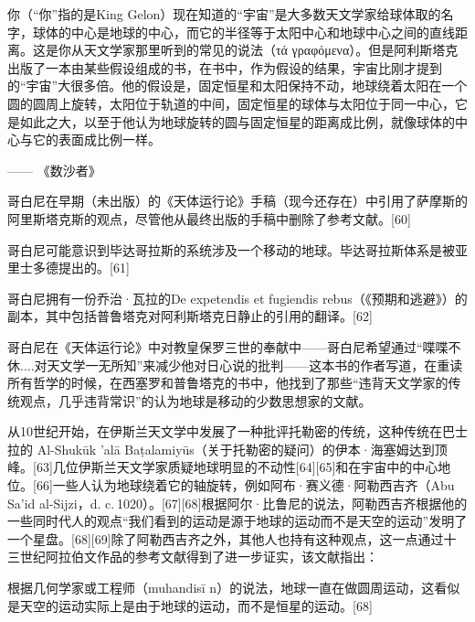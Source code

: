 你（“你”指的是King Gelon）现在知道的“宇宙”是大多数天文学家给球体取的名字，球体的中心是地球的中心，而它的半径等于太阳中心和地球中心之间的直线距离。这是你从天文学家那里听到的常见的说法（τά γραφόμενα）。但是阿利斯塔克出版了一本由某些假设组成的书，在书中，作为假设的结果，宇宙比刚才提到的“宇宙”大很多倍。他的假设是，固定恒星和太阳保持不动，地球绕着太阳在一个圆的圆周上旋转，太阳位于轨道的中间，固定恒星的球体与太阳位于同一中心，它是如此之大，以至于他认为地球旋转的圆与固定恒星的距离成比例，就像球体的中心与它的表面成比例一样。

—— 《数沙者》

哥白尼在早期（未出版）的《天体运行论》手稿（现今还存在）中引用了萨摩斯的阿里斯塔克斯的观点，尽管他从最终出版的手稿中删除了参考文献。[60]

哥白尼可能意识到毕达哥拉斯的系统涉及一个移动的地球。毕达哥拉斯体系是被亚里士多德提出的。[61]

哥白尼拥有一份乔治·瓦拉的De expetendis et fugiendis rebus（《预期和逃避》）的副本，其中包括普鲁塔克对阿利斯塔克日静止的引用的翻译。[62]

哥白尼在《天体运行论》中对教皇保罗三世的奉献中——哥白尼希望通过“喋喋不休....对天文学一无所知”来减少他对日心说的批判——这本书的作者写道，在重读所有哲学的时候，在西塞罗和普鲁塔克的书中，他找到了那些“违背天文学家的传统观点，几乎违背常识”的认为地球是移动的少数思想家的文献。

从10世纪开始，在伊斯兰天文学中发展了一种批评托勒密的传统，这种传统在巴士拉的 Al-Shukūk 'alā Baṭalamiyūs（关于托勒密的疑问）的伊本·海塞姆达到顶峰。[63]几位伊斯兰天文学家质疑地球明显的不动性[64][65]和在宇宙中的中心地位。[66]一些人认为地球绕着它的轴旋转，例如阿布·赛义德·阿勒西吉齐（Abu Sa'id al-Sijzi，d. c. 1020）。[67][68]根据阿尔·比鲁尼的说法，阿勒西吉齐根据他的一些同时代人的观点“我们看到的运动是源于地球的运动而不是天空的运动”发明了一个星盘。[68][69]除了阿勒西吉齐之外，其他人也持有这种观点，这一点通过十三世纪阿拉伯文作品的参考文献得到了进一步证实，该文献指出：

根据几何学家或工程师（muhandisī n）的说法，地球一直在做圆周运动，这看似是天空的运动实际上是由于地球的运动，而不是恒星的运动。[68]

